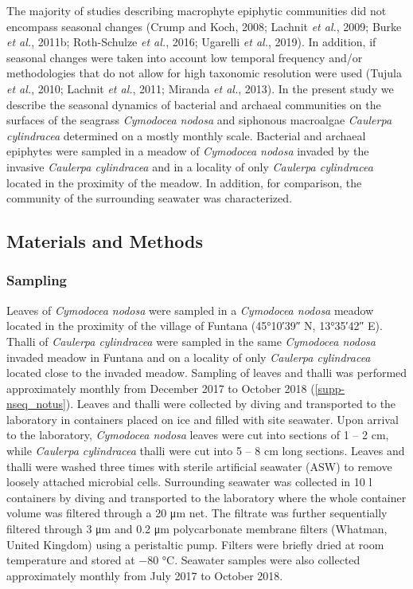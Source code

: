 \documentclass[12pt,]{article}
\begin{document}
The majority of studies describing macrophyte epiphytic communities did
not encompass seasonal changes (Crump and Koch, 2008; Lachnit \emph{et
al.}, 2009; Burke \emph{et al.}, 2011b; Roth-Schulze \emph{et al.},
2016; Ugarelli \emph{et al.}, 2019). In addition, if seasonal changes
were taken into account low temporal frequency and/or methodologies that
do not allow for high taxonomic resolution were used (Tujula \emph{et
al.}, 2010; Lachnit \emph{et al.}, 2011; Miranda \emph{et al.}, 2013).
In the present study we describe the seasonal dynamics of bacterial and
archaeal communities on the surfaces of the seagrass \emph{Cymodocea
nodosa} and siphonous macroalgae \emph{Caulerpa cylindracea} determined
on a mostly monthly scale. Bacterial and archaeal epiphytes were sampled
in a meadow of \emph{Cymodocea nodosa} invaded by the invasive
\emph{Caulerpa cylindracea} and in a locality of only \emph{Caulerpa
cylindracea} located in the proximity of the meadow. In addition, for
comparison, the community of the surrounding seawater was characterized.

\newpage

\hypertarget{materials-and-methods}{%
\subsection{Materials and Methods}\label{materials-and-methods}}

\hypertarget{sampling}{%
\subsubsection{Sampling}\label{sampling}}

Leaves of \emph{Cymodocea nodosa} were sampled in a \emph{Cymodocea
nodosa} meadow located in the proximity of the village of Funtana
(\ang{45;10;39} N, \ang{13;35;42} E). Thalli of \emph{Caulerpa
cylindracea} were sampled in the same \emph{Cymodocea nodosa} invaded
meadow in Funtana and on a locality of only \emph{Caulerpa cylindracea}
located close to the invaded meadow. Sampling of leaves and thalli was
performed approximately monthly from December 2017 to October 2018
(\autoref{supp-nseq_notus}). Leaves and thalli were collected by diving
and transported to the laboratory in containers placed on ice and filled
with site seawater. Upon arrival to the laboratory, \emph{Cymodocea
nodosa} leaves were cut into sections of 1 -- 2 \si{\cm}, while
\emph{Caulerpa cylindracea} thalli were cut into 5 -- 8 \si{\cm} long
sections. Leaves and thalli were washed three times with sterile
artificial seawater (ASW) to remove loosely attached microbial cells.
Surrounding seawater was collected in 10 \si{\l} containers by diving
and transported to the laboratory where the whole container volume was
filtered through a 20 \si{\um} net. The filtrate was further
sequentially filtered through 3 \si{\um} and 0.2 \si{\um} polycarbonate
membrane filters (Whatman, United Kingdom) using a peristaltic pump.
Filters were briefly dried at room temperature and stored at \num{-80}
\si{\degreeCelsius}. Seawater samples were also collected approximately
monthly from July 2017 to October 2018.
\end{document}
